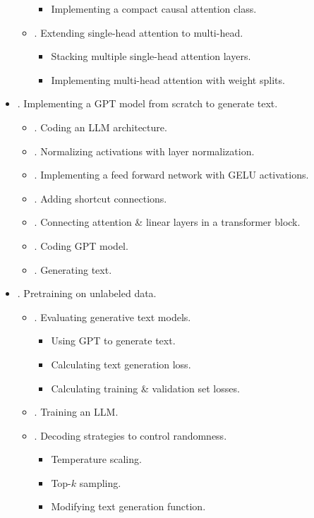 \documentclass{article}
\begin{document}
\begin{itemize}
\begin{itemize}
\begin{itemize}
			\item {\sf Implementing a compact causal attention class.}
		\end{itemize}
		\item {. Extending single-head attention to multi-head.}
		\begin{itemize}
			\item {\sf Stacking multiple single-head attention layers.}
			\item {\sf Implementing multi-head attention with weight splits.}
		\end{itemize}
	\end{itemize}
	\item {. Implementing a GPT model from scratch to generate text.}
	\begin{itemize}
		\item {. Coding an LLM architecture.}
		\item {. Normalizing activations with layer normalization.}
		\item {. Implementing a feed forward network with GELU activations.}
		\item {. Adding shortcut connections.}
		\item {. Connecting attention \& linear layers in a transformer block.}
		\item {. Coding GPT model.}
		\item {. Generating text.}
	\end{itemize}
	\item {. Pretraining on unlabeled data.}
	\begin{itemize}
		\item {. Evaluating generative text models.}
		\begin{itemize}
			\item {\sf Using GPT to generate text.}
			\item {\sf Calculating text generation loss.}
			\item {\sf Calculating training \& validation set losses.}
		\end{itemize}
		\item {. Training an LLM.}
		\item {. Decoding strategies to control randomness.}
		\begin{itemize}
			\item {\sf Temperature scaling.}
			\item {\sf Top-$k$ sampling.}
			\item {\sf Modifying text generation function.}

\end{itemize}
\end{itemize}
\end{itemize}
\end{document}
